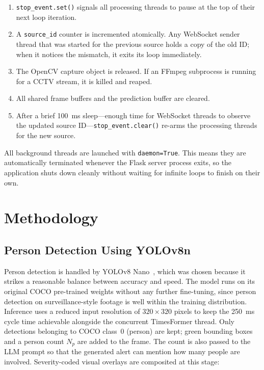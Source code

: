 \documentclass[conference]{IEEEtran}
\begin{document}
\begin{enumerate}
  \item \texttt{stop\_event.set()} signals all processing threads to
        pause at the top of their next loop iteration.

  \item A \texttt{source\_id} counter is incremented atomically. Any
        WebSocket sender thread that was started for the previous source
        holds a copy of the old ID; when it notices the mismatch, it
        exits its loop immediately.

  \item The OpenCV capture object is released. If an FFmpeg subprocess is
        running for a CCTV stream, it is killed and reaped.

  \item All shared frame buffers and the prediction buffer are cleared.

  \item After a brief 100~ms sleep---enough time for WebSocket threads
        to observe the updated source ID---\texttt{stop\_event.clear()}
        re-arms the processing threads for the new source.
\end{enumerate}

All background threads are launched with \texttt{daemon=True}. This
means they are automatically terminated whenever the Flask server process
exits, so the application shuts down cleanly without waiting for infinite
loops to finish on their own.

\section{Methodology}

\subsection{Person Detection Using YOLOv8n}

Person detection is handled by YOLOv8 Nano~\cite{jocher2023}, which was
chosen because it strikes a reasonable balance between accuracy and speed.
The model runs on its original COCO pre-trained weights without any
further fine-tuning, since person detection on surveillance-style footage
is well within the training distribution. Inference uses a reduced input
resolution of $320\times320$ pixels to keep the 250~ms cycle time
achievable alongside the concurrent TimesFormer thread. Only detections
belonging to COCO class~0 (person) are kept; green bounding boxes and a
person count $N_p$ are added to the frame. The count is also passed to
the LLM prompt so that the generated alert can mention how many people are
involved. Severity-coded visual overlays are composited at this stage:
\end{document}
